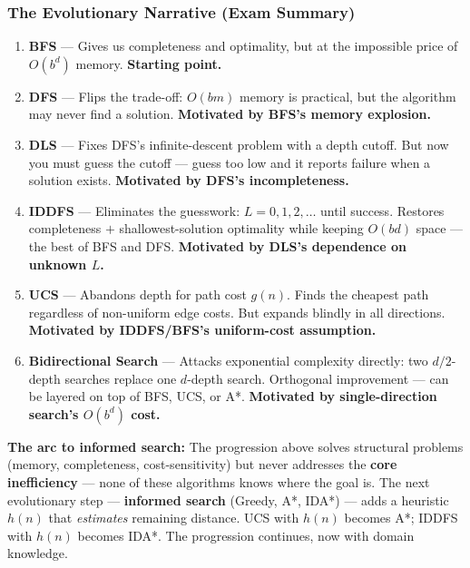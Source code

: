 \documentclass[12pt, a4paper]{article}
\newenvironment{notesbox}{\begin{mdframed}[style=notesframe]}{\end{mdframed}}
\begin{document}
\subsubsection*{The Evolutionary Narrative (Exam Summary)}

\begin{enumerate}[leftmargin=1.5cm, itemsep=5pt, topsep=3pt]
  \item \textbf{BFS} — Gives us completeness and optimality, but at the impossible price of $O(b^d)$ memory. \textbf{Starting point.}

  \item \textbf{DFS} — Flips the trade-off: $O(bm)$ memory is practical, but the algorithm may never find a solution. \textbf{Motivated by BFS's memory explosion.}

  \item \textbf{DLS} — Fixes DFS's infinite-descent problem with a depth cutoff. But now you must guess the cutoff — guess too low and it reports failure when a solution exists. \textbf{Motivated by DFS's incompleteness.}

  \item \textbf{IDDFS} — Eliminates the guesswork: $L=0,1,2,\ldots$ until success. Restores completeness $+$ shallowest-solution optimality while keeping $O(bd)$ space — the best of BFS and DFS. \textbf{Motivated by DLS's dependence on unknown $L$.}

  \item \textbf{UCS} — Abandons depth for path cost $g(n)$. Finds the cheapest path regardless of non-uniform edge costs. But expands blindly in all directions. \textbf{Motivated by IDDFS/BFS's uniform-cost assumption.}

  \item \textbf{Bidirectional Search} — Attacks exponential complexity directly: two $d/2$-depth searches replace one $d$-depth search. Orthogonal improvement — can be layered on top of BFS, UCS, or A*. \textbf{Motivated by single-direction search's $O(b^d)$ cost.}
\end{enumerate}

\begin{notesbox}
\textbf{The arc to informed search:} The progression above solves structural problems (memory, completeness, cost-sensitivity) but never addresses the \textbf{core inefficiency} — none of these algorithms knows where the goal is. The next evolutionary step — \textbf{informed search} (Greedy, A*, IDA*) — adds a heuristic $h(n)$ that \emph{estimates} remaining distance. UCS with $h(n)$ becomes A*; IDDFS with $h(n)$ becomes IDA*. The progression continues, now with domain knowledge.
\end{notesbox}
\end{document}

